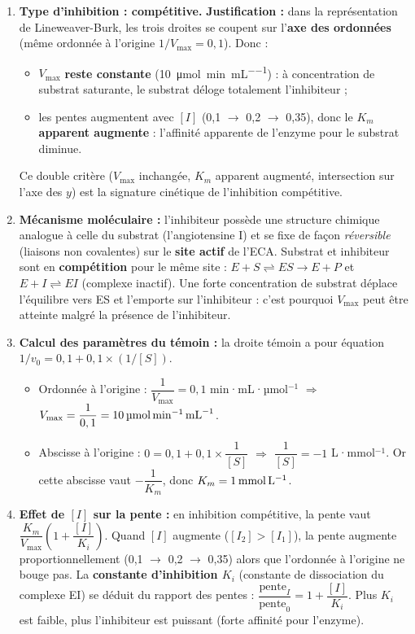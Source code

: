 \documentclass[11pt]{article}
\begin{document}
\begin{corrige}
\begin{enumerate}
    \item \textbf{Type d'inhibition : compétitive.} \textbf{Justification :} dans la représentation de Lineweaver-Burk, les trois droites se coupent sur l'\textbf{axe des ordonnées} (même ordonnée à l'origine $1/V_{\text{max}} = 0,1$). Donc :
    \begin{itemize}
        \item $V_{\text{max}}$ \textbf{reste constante} (\SI{10}{\micro\mol\per\minute\per\mL}) : à concentration de substrat saturante, le substrat déloge totalement l'inhibiteur ;
        \item les pentes augmentent avec $[I]$ (0,1 $\to$ 0,2 $\to$ 0,35), donc le $K_m$ \textbf{apparent augmente} : l'affinité apparente de l'enzyme pour le substrat diminue.
    \end{itemize}
    Ce double critère ($V_{\text{max}}$ inchangée, $K_m$ apparent augmenté, intersection sur l'axe des $y$) est la signature cinétique de l'inhibition compétitive.
    \item \textbf{Mécanisme moléculaire :} l'inhibiteur possède une structure chimique analogue à celle du substrat (l'angiotensine I) et se fixe de façon \emph{réversible} (liaisons non covalentes) sur le \textbf{site actif} de l'ECA. Substrat et inhibiteur sont en \textbf{compétition} pour le même site : $E + S \rightleftharpoons ES \rightarrow E + P$ et $E + I \rightleftharpoons EI$ (complexe inactif). Une forte concentration de substrat déplace l'équilibre vers ES et l'emporte sur l'inhibiteur : c'est pourquoi $V_{\text{max}}$ peut être atteinte malgré la présence de l'inhibiteur.
    \item \textbf{Calcul des paramètres du témoin :} la droite témoin a pour équation $1/v_0 = 0,1 + 0,1 \times (1/[S])$.
    \begin{itemize}
        \item Ordonnée à l'origine : $\dfrac{1}{V_{\text{max}}} = 0,1$ min·mL·µmol$^{-1}$ $\Rightarrow$ $V_{\text{max}} = \dfrac{1}{0,1} = \textbf{\SI{10}{\micro\mol\per\minute\per\mL}}$.
        \item Abscisse à l'origine : $0 = 0,1 + 0,1 \times \dfrac{1}{[S]}$ $\Rightarrow$ $\dfrac{1}{[S]} = -1$ L·mmol$^{-1}$. Or cette abscisse vaut $-\dfrac{1}{K_m}$, donc $K_m = \textbf{\SI{1}{\mmol\per\liter}}$.
    \end{itemize}
    \item \textbf{Effet de $[I]$ sur la pente :} en inhibition compétitive, la pente vaut $\dfrac{K_m}{V_{\text{max}}}\left(1 + \dfrac{[I]}{K_i}\right)$. Quand $[I]$ augmente ($[I_2] > [I_1]$), la pente augmente proportionnellement (0,1 $\to$ 0,2 $\to$ 0,35) alors que l'ordonnée à l'origine ne bouge pas. La \textbf{constante d'inhibition $K_i$} (constante de dissociation du complexe EI) se déduit du rapport des pentes : $\dfrac{\text{pente}_I}{\text{pente}_0} = 1 + \dfrac{[I]}{K_i}$. Plus $K_i$ est faible, plus l'inhibiteur est puissant (forte affinité pour l'enzyme).

\end{enumerate}
\end{corrige}
\end{document}
